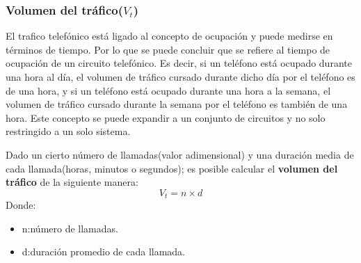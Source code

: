 \documentclass[
	12pt, %
	fleqn, %
	a4paper, %
	oneside, %
]{LegrandOrangeBook}
\begin{document}
\subsubsection{Volumen del tráfico($V_t$)}
El trafico telefónico está ligado al concepto de ocupación y puede medirse en términos de tiempo. Por lo que se puede concluir que se refiere al tiempo de ocupación de un circuito telefónico. Es decir, si un teléfono está ocupado durante una hora al día, el volumen de tráfico cursado durante dicho día por el teléfono es de una hora, y si un teléfono está ocupado durante una hora a la semana, el volumen de tráfico cursado durante la semana por el teléfono es también de una hora. Este concepto se puede expandir a un conjunto de circuitos y no solo restringido a un solo sistema.
\begin{definition}
Dado un cierto número de llamadas(valor adimensional) y una duración media de cada llamada(horas, minutos o segundos); es posible calcular el \textbf{volumen del tráfico} de la siguiente manera:
\begin{equation}\label{eq:volumen trafico}
V_t=n\times d
\end{equation}
Donde:
\begin{itemize}
\item n:número de llamadas.
\item d:duración promedio de cada llamada.
\end{itemize}
\end{definition}
\end{document}

